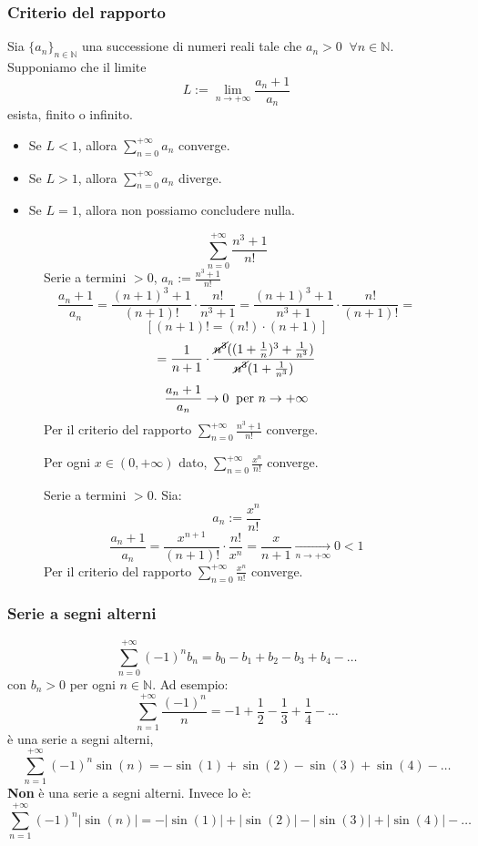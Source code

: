 \documentclass[a4paper]{article}
\theoremstyle{break}
\theoremstyle{break}
\theoremstyle{break}
\theoremstyle{break}
\begin{document}
\subsubsection{Criterio del rapporto}
Sia \( \{a_n\}_{n \in \mathbb{N}}  \) una successione di numeri reali tale che \( a_n > 0 \;\; \forall n \in \mathbb{N} \).
Supponiamo che il limite \[
  L := \lim_{n \to +\infty} \frac{a_n+1}{a_n}
\] 
esista, finito o infinito.
\begin{itemize}
  \item Se \( L < 1 \), allora \( \sum_{n=0}^{+\infty} a_n \) converge.
  \item Se \( L > 1 \), allora \( \sum_{n=0}^{+\infty} a_n \) diverge.
  \item Se \( L = 1 \), allora non possiamo concludere nulla.
\end{itemize}

\begin{figure}[H]
  \begin{example}
    \[
      \sum_{n=0}^{+\infty} \frac{n^3+1}{n!}
    \] 
    Serie a termini \( > 0 \), \( a_n := \frac{n^3+1}{n!} \) 
    \[
      \frac{a_n+1}{a_n} = \frac{(n+1)^3+1}{(n+1)!} \cdot \frac{n!}{n^3+1} = \frac{(n+1)^3 + 1}{n^3+1} \cdot \frac{n!}{(n+1)!} =
    \] 
    \[
      \left[ (n+1)! = (n!)\cdot (n+1) \right] 
    \] 
    \[
      = \frac{1}{n+1} \cdot \frac{\cancel{n^3} ((1+\frac{1}{n})^3 + \frac{1}{n^3})}{\cancel{n^3} (1+ \frac{1}{n^3})}
    \] 
    \[
      \frac{a_n+1}{a_n} \to 0 \;\;\text{per \( n \to +\infty \)}
    \] 
    Per il criterio del rapporto \( \sum_{n=0}^{+\infty} \frac{n^3+1}{n!} \) converge.
  \end{example}
\end{figure}
\begin{figure}[H]
  \begin{example}
    Per ogni \( x \in (0, +\infty) \) dato, \( \sum_{n=0}^{+\infty} \frac{x^n}{n!} \) converge.

    Serie a termini \( >0 \). Sia:
    \[
      a_n := \frac{x^n}{n!}
    \] 
    \[
      \frac{a_n +1}{a_n} = \frac{x^{n+1}}{(n+1)!} \cdot \frac{n!}{x^n} = \frac{x}{n+1} \underset{n \to +\infty}{\to } 0 < 1
    \] 
    Per il criterio del rapporto \( \sum_{n=0}^{+\infty} \frac{x^n}{n!} \) converge.
  \end{example}
\end{figure}
\subsubsection{Serie a segni alterni}
\[
  \sum_{n=0}^{+\infty} (-1)^n b_n = b_0 - b_1 + b_2 - b_3 + b_4 - \ldots
\] 
con \( b_n > 0 \) per ogni \( n \in  \mathbb{N} \). Ad esempio:
\[
  \sum_{n=1}^{+\infty} \frac{(-1)^n}{n} = -1 + \frac{1}{2} - \frac{1}{3} + \frac{1}{4} - \ldots
\] 
è una serie a segni alterni,
\[
  \sum_{n=1}^{+\infty} (-1)^n \sin(n) = -\sin(1) + \sin(2) - \sin(3) + \sin(4) - \ldots
\] 
\textbf{Non} è una serie a segni alterni. Invece lo è:
\[
  \sum_{n=1}^{+\infty} (-1)^n |\sin(n)| = -|\sin(1)| + |\sin(2)| - |\sin(3)| + |\sin(4)| - \ldots
\] 
\end{document}
